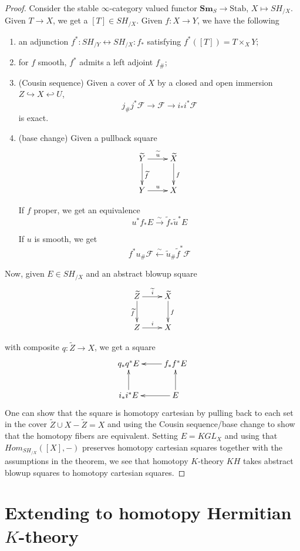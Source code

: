 \documentclass[edeposit,fullpage]{uiucthesis2009}
\newcommand{\mc}{\mathcal}
\newcommand{\Sm}[1]{\mathbf{Sm}_{#1}}
\theoremstyle{plain}
\numberwithin{lemma}{section}
\theoremstyle{definition}
\begin{document}
\begin{proof}

Consider the stable $\infty$-category valued functor $\Sm{S}
\rightarrow \mathrm{Stab}$, $X \mapsto SH_{/X}$. Given $T
\rightarrow X$, we get a $[T] \in SH_{/X}$. Given $f : X \rightarrow Y$,
we have the following
\begin{enumerate}
\item an adjunction $f^*: SH_{/Y} \leftrightarrow SH_{/X} : f_*$ satisfying
  $f^*([T]) = T \times_X Y$;
\item for $f$ smooth, $f^*$ admits a left adjoint $f_{\#}$;
\item (Cousin sequence) Given a cover of $X$ by a closed and open
  immersion $Z \hookrightarrow X \hookleftarrow U$, 
\[
j_\# j^* \mc F \rightarrow \mc F \rightarrow i_* i^* \mc F
\]
is exact.
\item (base change) Given a pullback square
\[
\xymatrix{\widetilde Y \ar[r]^{\widetilde u}\ar[d]^{\widetilde f} & \widetilde X \ar[d]^f \\ Y
  \ar[r]^u & X}
\]

If $f$ proper, we get an equivalence
\[
u^* f_* E \xrightarrow{\sim} \widetilde f_* \widetilde u^* E
\]

If $u$ is smooth, we get
\[
f^* u_\# \mc F \xleftarrow{\sim} \widetilde u_\# \widetilde f^* \mc F
\]
\end{enumerate}


Now, given $E \in SH_{/X}$ and an abstract blowup square
\[
\xymatrix{\widetilde Z \ar[r]^{\widetilde i}\ar[d]_{\widetilde f} & \widetilde X \ar[d]^f \\ Z \ar[r]^i &X}
\]

with composite $q : \widetilde Z \rightarrow X$, we get a square 
\[
\xymatrix{q_*q^* E & \ar[l] f_*f^* E \\ i_*i^*E \ar[u] & E \ar[l]\ar[u]}
\]
One can show that the
square is homotopy cartesian by pulling back to each set in the cover $\widetilde
Z \cup X-\widetilde Z = X$ and using the Cousin sequence/base change
to show that the homotopy fibers are equivalent.
Setting $E = KGL_{X}$ and using that $Hom_{SH_{/X}}([X],-)$ preserves
homotopy cartesian squares together with the assumptions in the theorem,  we see that
homotopy $K$-theory $KH$ takes abstract blowup squares to homotopy cartesian squares.
\end{proof}

\section{Extending to homotopy Hermitian $K$-theory}
\end{document}
